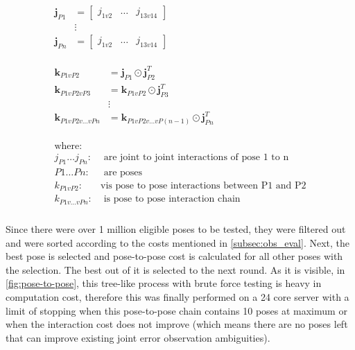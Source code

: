 \documentclass[english, printversion, nomenclature, notitle]{tuvisionthesis} %
\begin{document}
\begin{align}
\begin{split}\label{eq:j2j}
\mathbf{j}_{P1} &= [\begin{array}{ccc} j_{1v2} & \dots & j_{13v14} \end{array} ]\\
&\vdots\\
\mathbf{j}_{Pn} &= [\begin{array}{ccc} j_{1v2} & \dots & j_{13v14} \end{array} ]\\
\end{split}\\ \nonumber\\
\begin{split}\label{eq:p2p}
\mathbf{k}_{P1vP2} &= \mathbf{j}_{P1} \odot \mathbf{j}_{P2}^T\\
\mathbf{k}_{P1vP2vP3} &=\mathbf{k}_{P1vP2} \odot \mathbf{j}_{P3}^T\\
&\vdots\\
\mathbf{k}_{P1vP2v\dots vPn} &= \mathbf{k}_{P1vP2v\dots vP(n-1)}  \odot \mathbf{j}_{Pn}^T\\
\end{split}\\ \nonumber\\
\begin{split}
\text{where:}&\\
j_{P1}\dots j_{Pn} : & \text{ are joint to joint interactions of pose 1 to n}\\
P1 \dots Pn : & \text{ are poses}\\
k_{P1vP2} : & \text{vis pose to pose interactions between P1 and P2}\\
k_{P1v \dots vPn} : & \text{ is pose to pose interaction chain}
\nonumber\\
\end{split}
\end{align}

Since there were over 1 million eligible poses to be tested, they were filtered out and were sorted according to the costs mentioned in \cref{subsec:obs_eval}. Next, the best pose is selected and pose-to-pose cost is calculated for all other poses with the selection. The best out of it is selected to the next round. As it is visible, in \cref{fig:pose-to-pose}, this tree-like process with brute force testing is heavy in computation cost, therefore this was finally performed on a 24 core server with a limit of stopping when this pose-to-pose chain contains 10 poses at maximum or when the interaction cost does not improve (which means there are no poses left that can improve existing joint error observation ambiguities).
\end{document}
